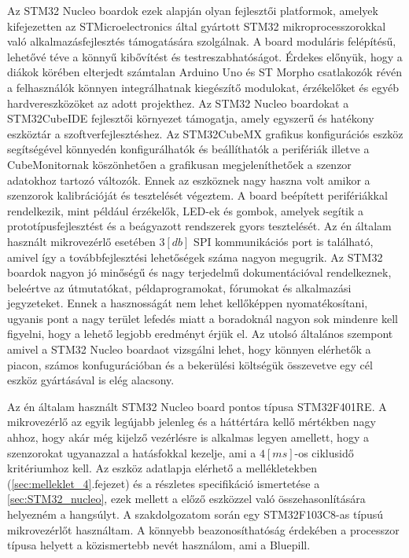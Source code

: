 Az STM32 Nucleo boardok ezek alapján olyan fejlesztői platformok, amelyek kifejezetten az STMicroelectronics által gyártott STM32 mikroprocesszorokkal való alkalmazásfejlesztés támogatására szolgálnak. A board moduláris felépítésű, lehetővé téve a könnyű kibővítést és testreszabhatóságot. Érdekes előnyük, hogy a diákok körében elterjedt számtalan Arduino Uno és ST Morpho csatlakozók révén a felhasználók könnyen integrálhatnak kiegészítő modulokat, érzékelőket és egyéb hardvereszközöket az adott projekthez. Az STM32 Nucleo boardokat a STM32CubeIDE fejlesztői környezet támogatja, amely egyszerű és hatékony eszköztár a szoftverfejlesztéshez. Az STM32CubeMX grafikus konfigurációs eszköz segítségével könnyedén konfigurálhatók és beállíthatók a perifériák illetve a CubeMonitornak köszönhetően a grafikusan megjeleníthetőek a szenzor adatokhoz tartozó változók. Ennek az eszköznek nagy haszna volt amikor a szenzorok kalibrációját és tesztelését végeztem. A board beépített perifériákkal rendelkezik, mint például érzékelők, LED-ek és gombok, amelyek segítik a prototípusfejlesztést és a beágyazott rendszerek gyors tesztelését. Az én általam használt mikrovezérlő esetében $3[db]$ SPI kommunikációs port is található, amivel így a továbbfejlesztési lehetőségek száma nagyon megugrik. Az STM32 boardok nagyon jó minőségű és nagy terjedelmű dokumentációval rendelkeznek, beleértve az útmutatókat, példaprogramokat, fórumokat és alkalmazási jegyzeteket. Ennek a hasznosságát nem lehet kellőképpen nyomatékosítani, ugyanis pont a nagy terület lefedés miatt a boradoknál nagyon sok mindenre kell figyelni, hogy a lehető legjobb eredményt érjük el. Az utolsó általános szempont amivel a STM32 Nucleo boardaot vizsgálni lehet, hogy könnyen elérhetők a piacon, számos konfugurációban és a bekerülési költségük összevetve egy cél eszköz gyártásával is elég alacsony.

Az én általam használt STM32 Nucleo board pontos típusa STM32F401RE. A mikrovezérlő az egyik legújabb jelenleg és a háttértára kellő mértékben nagy ahhoz, hogy akár még kijelző vezérlésre is alkalmas legyen amellett, hogy a szenzorokat ugyanazzal a hatásfokkal kezelje, ami a $4[ms]$-os ciklusidő kritériumhoz kell. Az eszköz adatlapja elérhető a mellékletekben (\ref{sec:melleklet_4}.fejezet) és a részletes specifikáció ismertetése a \ref{sec:STM32_nucleo}, ezek mellett a előző eszközzel való összehasonlítására helyezném a hangsúlyt. A szakdolgozatom során egy STM32F103C8-as típusú mikrovezérlőt használtam. A könnyebb beazonosíthatóság érdekében a processzor típusa helyett a közismertebb nevét használom, ami a Bluepill.

